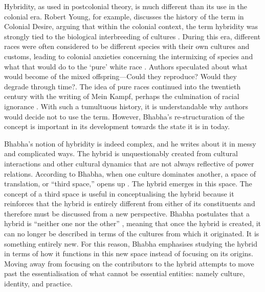 	Hybridity, as used in postcolonial theory, is much different than its use in the colonial era. Robert Young, for example, discusses the history of the term in Colonial Desire, arguing that within the colonial context, the term hybridity was strongly tied to the biological interbreeding of cultures \parencite [6] {Young_1995}. During this era, different races were often considered to be different species with their own cultures and customs, leading to colonial anxieties concerning the intermixing of species and what that would do to the ‘pure’ white race \parencite [6] {Young_1995}. Authors speculated about what would become of the mixed offspring—Could they reproduce? Would they degrade through time?\parencite [8] {Young_1995}.  The idea of pure races continued into the twentieth century with the writing of Mein Kampf, perhaps the culmination of racial ignorance \parencite [8] {Young_1995}. With such a tumultuous history, it is understandable why authors would decide not to use the term. However, Bhabha’s re-structuration of the concept is important in its development towards the state it is in today. 
	
	
	Bhabha’s notion of hybridity is indeed complex, and he writes about it in messy and complicated ways. The hybrid is unquestionably created from cultural interactions and other cultural dynamics that are not always reflective of power relations. According to Bhabha, when one culture dominates another, a space of translation, or “third space,” opens up \parencite[53] {Bhabha_1994}. The hybrid emerges in this space. The concept of a third space is useful in conceptualising the hybrid because it reinforces that the hybrid is entirely different from either of its constituents and therefore must be discussed from a new perspective. Bhabha postulates that a hybrid is “neither one nor the other” \parencite[49] {Bhabha_1994} , meaning that once the hybrid is created, it can no longer be described in terms of the cultures from which it originated. It is something entirely new. For this reason, Bhabha emphasises studying the hybrid in terms of how it functions in this new space instead of focusing on its origins. Moving away from focusing on the contributors to the hybrid attempts to move past the essentialisation of what cannot be essential entities: namely culture, identity, and practice. 
	
